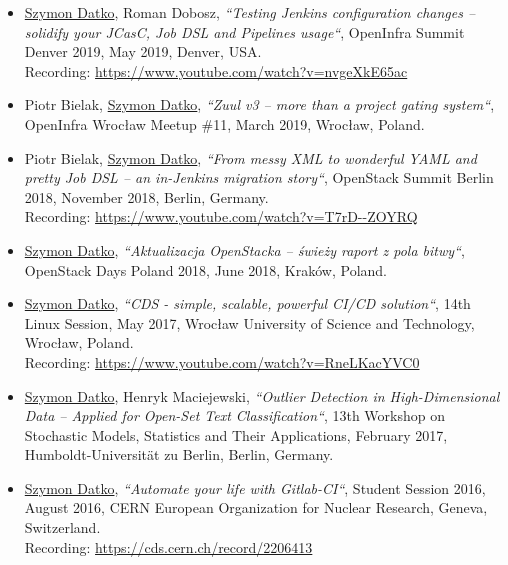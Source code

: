 \begin{itemize}
    \item
        \underline{Szymon Datko}, Roman Dobosz,
        \textit{“Testing Jenkins configuration changes – solidify your JCasC, Job DSL and Pipelines usage“},
        OpenInfra Summit Denver 2019,
        May 2019, Denver, USA.\\
        Recording: \url{https://www.youtube.com/watch?v=nvgeXkE65ac}

    \item
        Piotr Bielak, \underline{Szymon Datko},
        \textit{“Zuul v3 – more than a project gating system“},
        OpenInfra Wrocław Meetup \#11,
        March 2019, Wrocław, Poland.

    \item
        Piotr Bielak, \underline{Szymon Datko},
        \textit{“From messy XML to wonderful YAML and pretty Job DSL – an in-Jenkins migration story“},
        OpenStack Summit Berlin 2018,
        November 2018, Berlin, Germany.\\
        Recording: \url{https://www.youtube.com/watch?v=T7rD--ZOYRQ}

    \item
        \underline{Szymon Datko},
        \textit{“Aktualizacja OpenStacka – świeży raport z pola bitwy“},
        OpenStack Days Poland 2018,
        June 2018, Kraków, Poland.

    \item
        \underline{Szymon Datko},
        \textit{“CDS - simple, scalable, powerful CI/CD solution“},
        14th Linux Session,
        May 2017, Wrocław University of Science and Technology, Wrocław, Poland.\\
        Recording: \url{https://www.youtube.com/watch?v=RneLKacYVC0}

    \item
        \underline{Szymon Datko}, Henryk Maciejewski,
        \textit{“Outlier Detection in High-Dimensional Data – Applied for Open-Set Text Classification“},
        13th Workshop on Stochastic Models, Statistics and Their Applications,
        February 2017, Humboldt-Universität zu Berlin, Berlin, Germany.

    \item
        \underline{Szymon Datko},
        \textit{“Automate your life with Gitlab-CI“},
        Student Session 2016,
        August 2016, CERN European Organization for Nuclear Research, Geneva, Switzerland.\\
        Recording: \url{https://cds.cern.ch/record/2206413}
\end{itemize}


